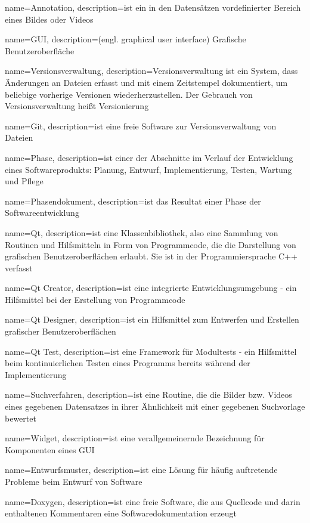 {
name=Annotation,
description={ist ein in den Datensätzen vordefinierter Bereich eines Bildes oder Videos}
}

{
name=GUI,
description={(engl. graphical user interface) Grafische Benutzeroberfläche}
}

{
name=Versionsverwaltung,
description={Versionsverwaltung ist ein System, dass Änderungen an Dateien erfasst und mit einem Zeitstempel dokumentiert, um beliebige vorherige Versionen wiederherzustellen. Der Gebrauch von Versionsverwaltung heißt Versionierung}
}

{
name=Git,
description={ist eine freie Software zur Versionsverwaltung von Dateien}
}

{
name=Phase,
description={ist einer der Abschnitte im Verlauf der Entwicklung eines Softwareprodukts: Planung, Entwurf, Implementierung, Testen, Wartung und Pflege}
}

{
name=Phasendokument,
description={ist das Resultat einer Phase der Softwareentwicklung}
}

{
name=Qt,
description={ist eine Klassenbibliothek, also eine Sammlung von Routinen und Hilfsmitteln in Form von Programmcode, die die Darstellung von grafischen Benutzeroberflächen erlaubt. Sie ist in der Programmiersprache C++ verfasst}
}

{
name=Qt Creator,
description={ist eine integrierte Entwicklungsumgebung - ein Hilfsmittel bei der Erstellung von Programmcode}
}

{
name=Qt Designer,
description={ist ein Hilfsmittel zum Entwerfen und Erstellen grafischer Benutzeroberflächen}
}

{
name=Qt Test,
description={ist eine Framework für Modultests - ein Hilfsmittel beim kontinuierlichen Testen eines Programms bereits während der Implementierung}
}

{
name=Suchverfahren,
description={ist eine Routine, die die Bilder bzw. Videos eines gegebenen Datensatzes in ihrer Ähnlichkeit mit einer gegebenen Suchvorlage bewertet}
}

{
name=Widget,
description={ist eine verallgemeinernde Bezeichnung für Komponenten eines GUI}
}

{
name=Entwurfsmuster,
description={ist eine Lösung für häufig auftretende Probleme beim Entwurf von Software}
}

{
name=Doxygen,
description={ist eine freie Software, die aus Quellcode und darin enthaltenen Kommentaren eine Softwaredokumentation erzeugt}
}
